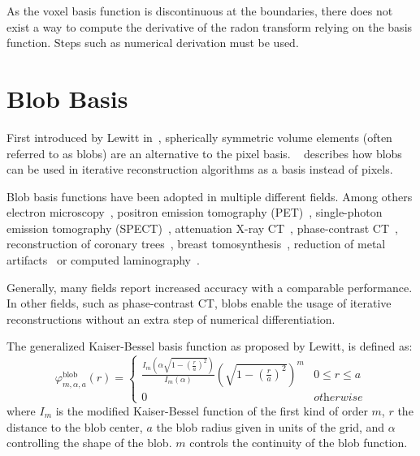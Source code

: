 As the voxel basis function is discontinuous at the boundaries, there does not exist a way to
compute the derivative of the radon transform relying on the basis function. Steps such as numerical
derivation must be used.


\section{Blob Basis}\label{sec:blob_basis}

First introduced by Lewitt in~\cite{lewitt_multidimensional_1990}, spherically symmetric volume
elements (often referred to as blobs) are an alternative to the pixel basis.
~\cite{lewitt_alternatives_1992} describes how blobs can be used in iterative reconstruction
algorithms as a basis instead of pixels.

Blob basis functions have been adopted in multiple different fields. Among others electron
microscopy~\cite{marabini_3d_1998, garduno_optimization_2001}, positron emission tomography
(PET)~\cite{jacobs_comparative_1999, chlewicki_noise_2004}, single-photon emission tomography
(SPECT)~\cite{wang_3d_2004, yendiki_comparison_2004}, attenuation X-ray
CT~\cite{jacobs_iterative_1999, carvalho_helical_2003, isola_motion-compensated_2008},
phase-contrast CT~\cite{kohler_iterative_2011, xu_investigation_2012}, reconstruction of coronary
trees~\cite{zhou_blob-based_2008}, breast tomosynthesis~\cite{wu_breast_2010}, reduction of metal
artifacts~\cite{levakhina_two-step_2010} or computed laminography~\cite{trampert_spherically_2017}.


Generally, many fields report increased accuracy with a comparable performance. In other fields,
such as phase-contrast CT, blobs enable the usage of iterative reconstructions without an extra step
of numerical differentiation.

The generalized Kaiser-Bessel basis function as proposed by Lewitt, is defined as:
\begin{equation}\label{eq:blob_basis_fn}
	\varphi^{\text{blob}}_{m, \alpha, a}(r) =
	\begin{cases}
		\frac{I_m\left( \alpha \sqrt{1 - \left(\frac{r}{a}\right)^2} \right)} {I_m\left( \alpha \right)} \left( \sqrt{1 - \left(\frac{r}{a}\right)^2}\right)^m & 0 \le r \le a      \\
		0                                                                                                                                                      & \textit{otherwise}
	\end{cases}
\end{equation}
where \(I_m\) is the modified Kaiser-Bessel function of the first kind of order \(m\), \(r\) the
distance to the blob center, \(a\) the blob radius given in units of the grid, and \(\alpha\)
controlling the shape of the blob. \(m\) controls the continuity of the blob function.

